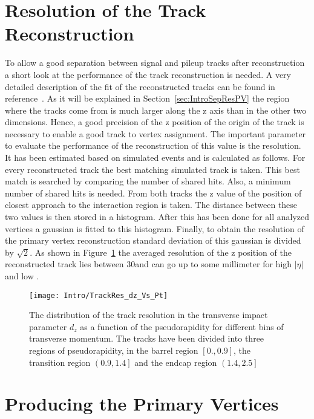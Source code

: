 \section{Resolution of the Track Reconstruction}

To allow a good separation between signal and pileup tracks after reconstruction a short look at the performance of the track reconstruction is needed. A very detailed description of the fit of the reconstructed tracks can be found in reference~. As it will be explained in Section~\ref{sec:IntroSepResPV} the region where the tracks come from is much larger along the z axis than in the other two dimensions. Hence, a good precision of the z position of the origin of the track is necessary to enable a good track to vertex assignment. The important parameter to evaluate the performance of the reconstruction of this value is the resolution. It has been estimated based on simulated events and is calculated as follows. For every reconstructed track the best matching simulated track is taken. This best match is searched by comparing the number of shared hits. Also, a minimum number of shared hits is needed. From both tracks the z value of the position of closest approach to the interaction region is taken. The distance between these two values is then stored in a histogram. After this has been done for all analyzed vertices a gaussian is fitted to this histogram. Finally, to obtain the resolution of the primary vertex reconstruction standard deviation of this gaussian is divided by $\sqrt{2}$.  As shown in Figure~\ref{plot:IntroTrackRes} the averaged resolution of the z position of the reconstructed track lies between 30\mum and can go up to some millimeter for high $\left|\eta\right|$ and low \pt. 

\begin{figure}[!Hhtb]
  \centering
  \texttt{[image: Intro/TrackRes\_dz\_Vs\_Pt]}
  \caption[Track resolution \vs pseudo rapidity for different bins of transverse momentum]{The distribution of the track resolution in the transverse impact parameter $d_{z}$ as a function of the pseudorapidity for different bins of transverse momentum. The tracks have been divided into three regions of pseudorapidity, in the barrel region $\left[0., 0.9\right]$, the transition region $\left(0.9, 1.4\right]$ and the endcap region $\left(1.4, 2.5\right]$\label{plot:IntroTrackRes}}
\end{figure}

\section{Producing the Primary Vertices\label{sec:IntroProdPV}}

